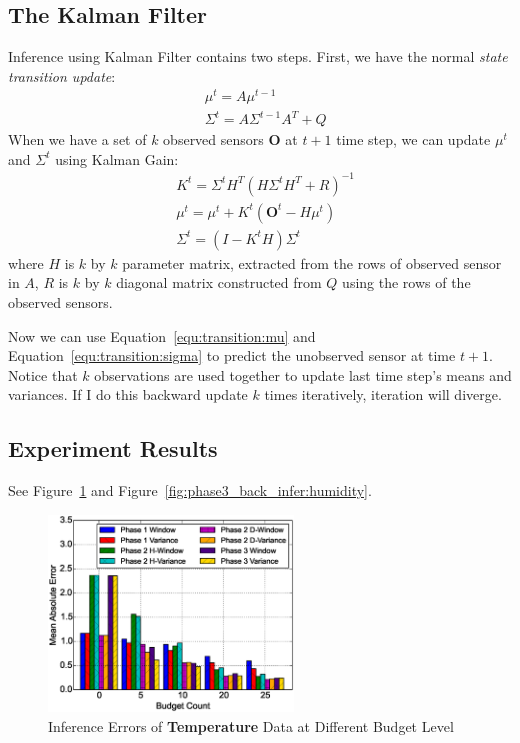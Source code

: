 \documentclass[12pt]{article}  %
\theoremstyle{definition}
\theoremstyle{remark}
\begin{document}
\subsection{The Kalman Filter}
Inference using Kalman Filter contains two steps.
First, we have the normal \textit{state transition update}:
\begin{align}
        & \mu^{t} = \mathit{A} \mu^{t-1} \label{equ:transition:mu} \\
        & \Sigma^{t} = \mathit{A}\Sigma^{t-1}\mathit{A}^\mathit{T} + \mathit{Q}\label{equ:transition:sigma}
\end{align}
When we have a set of $k$ observed sensors $\mathbf{O}$ at $t+1$ time step,
we can update $\mu^{t}$ and $\Sigma^{t}$ using Kalman Gain:
\begin{align}
        & K^t = \Sigma^t H^T (H\Sigma^{t}H^T + R)^{-1} \\
        & \mu^t = \mu^t + K^t(\mathbf{O}^t - H\mu^t) \\
        & \Sigma^t = (I - K^t H)\Sigma^t 
\end{align}
where $H$ is $k$ by $k$ parameter matrix, extracted from the rows of observed sensor in $A$,
$R$ is $k$ by $k$ diagonal matrix constructed from $Q$ using the rows of the observed sensors.

Now we can use Equation~\ref{equ:transition:mu} and Equation~\ref{equ:transition:sigma}
to predict the unobserved sensor at time $t+1$.
Notice that $k$ observations are used together to update last time step's means and variances.
If I do this backward update $k$ times iteratively, iteration will diverge.


\subsection{Experiment Results}
See Figure~\ref{fig:phase3_back_infer:temperature} and Figure~\ref{fig:phase3_back_infer:humidity}.

\begin{figure}[H]
\centering
        \includegraphics[width=0.58\textwidth]{../phase3_backinfer/temperature_back_infer_err}
        \caption{Inference Errors of \textbf{Temperature} Data at Different Budget Level}
\label{fig:phase3_back_infer:temperature}
\end{figure}
\end{document}
